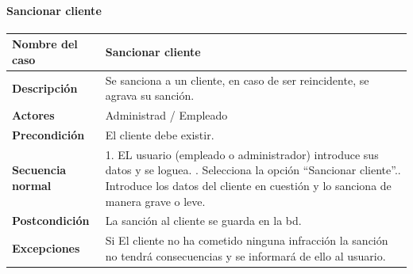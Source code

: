 \paragraph{Sancionar cliente}
\begin{table}[H]
    \centering
    \small
    \begin{tabularx}{0.8\textwidth}{|p{3.5cm}|X|}
        \hline
        \rowcolor{lightgray}
        \textbf{Nombre del caso}  & \textbf{Sancionar cliente}                                                                                            \\
        \hline
        \textbf{Descripción}      & Se sanciona a un cliente, en caso de ser reincidente, se agrava su sanción.                                           \\
        \hline
        \textbf{Actores}          & Administrad / Empleado                                                                                                \\
        \hline
        \textbf{Precondición}     & El cliente debe existir.                                                                                              \\
        \hline
        \textbf{Secuencia normal} & 1. EL usuario (empleado o administrador) introduce sus datos y se loguea. \newline
        2. Selecciona la opción ``Sancionar cliente''.\newline
        3. Introduce los datos del cliente en cuestión y lo sanciona de manera grave o leve.                                                              \\
        \hline
        \textbf{Postcondición}    & La sanción al cliente se guarda en la \gls{bd}.                                                                       \\
        \hline
        \textbf{Excepciones}      & Si El cliente no ha cometido ninguna infracción la sanción no tendrá consecuencias y se informará de ello al usuario. \\
        \hline
    \end{tabularx}
\end{table}
